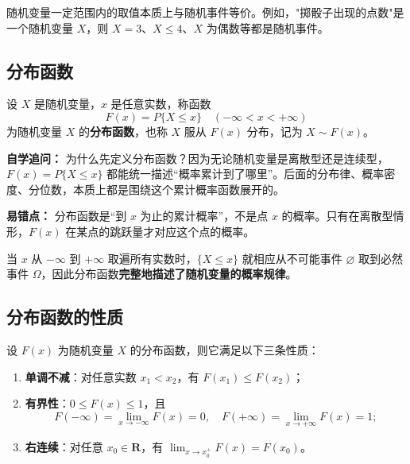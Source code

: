 ﻿\documentclass[lang=cn,11pt]{elegantbook}
\begin{document}
\begin{note}
随机变量一定范围内的取值本质上与随机事件等价。例如，"掷骰子出现的点数"是一个随机变量 \(X\)，则 \(X=3\)、\(X \le 4\)、\(X\) 为偶数等都是随机事件。
\end{note}

\subsection{分布函数}

\begin{definition}[分布函数] \label{def:distribution-function}
设 \(X\) 是随机变量，\(x\) 是任意实数，称函数
\[
F(x) = P\{X \le x\} \quad (-\infty < x < +\infty)
\]
为随机变量 \(X\) 的\textbf{分布函数}，也称 \(X\) 服从 \(F(x)\) 分布，记为 \(X \sim F(x)\)。
\end{definition}

\begin{note}
\textbf{自学追问：} 为什么先定义分布函数？因为无论随机变量是离散型还是连续型，\(F(x)=P\{X\le x\}\) 都能统一描述“概率累计到了哪里”。后面的分布律、概率密度、分位数，本质上都是围绕这个累计概率函数展开的。

\textbf{易错点：} 分布函数是“到 \(x\) 为止的累计概率”，不是点 \(x\) 的概率。只有在离散型情形，\(F(x)\) 在某点的跳跃量才对应这个点的概率。
\end{note}

当 \(x\) 从 \(-\infty\) 到 \(+\infty\) 取遍所有实数时，\(\{X \le x\}\) 就相应从不可能事件 \(\varnothing\) 取到必然事件 \(\Omega\)，因此分布函数\textbf{完整地描述了随机变量的概率规律}。


\subsection{分布函数的性质}

\begin{property}\label{prop:distribution-function}
设 \(F(x)\) 为随机变量 \(X\) 的分布函数，则它满足以下三条性质：
\begin{enumerate}
    \item \textbf{单调不减}：对任意实数 \(x_1 < x_2\)，有 \(F(x_1) \le F(x_2)\)；
    \item \textbf{有界性}：\(0 \le F(x) \le 1\)，且
    \[
    F(-\infty) = \lim_{x \to -\infty} F(x) = 0, \quad F(+\infty) = \lim_{x \to +\infty} F(x) = 1;
    \]
    \item \textbf{右连续}：对任意 \(x_0 \in \mathbf{R}\)，有 \(\lim_{x \to x_0^+} F(x) = F(x_0)\)。
\end{enumerate}
\end{property}
\end{document}
